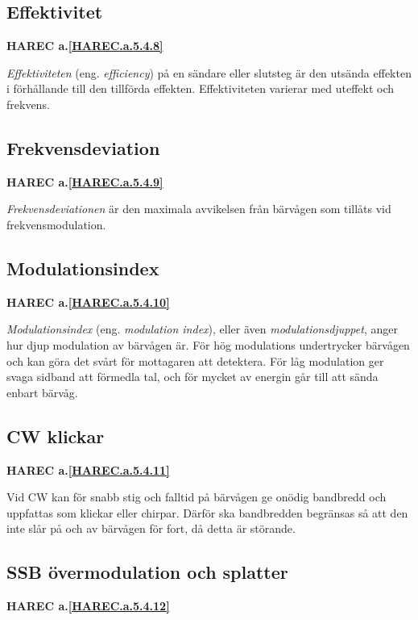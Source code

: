 \subsection{Effektivitet}
\textbf{HAREC
  a.\ref{HAREC.a.5.4.8}\label{myHAREC.a.5.4.8}
}

\emph{Effektiviteten} (eng. \emph{efficiency}) på en sändare eller slutsteg
är den utsända effekten i förhållande till den tillförda effekten.
Effektiviteten varierar med uteffekt och frekvens.

\subsection{Frekvensdeviation}
\textbf{HAREC
  a.\ref{HAREC.a.5.4.9}\label{myHAREC.a.5.4.9}
}

\emph{Frekvensdeviationen} är den maximala avvikelsen från bärvågen som
tillåts vid frekvensmodulation.

\subsection{Modulationsindex}
\textbf{HAREC
  a.\ref{HAREC.a.5.4.10}\label{myHAREC.a.5.4.10}
}

\emph{Modulationsindex} (eng. \emph{modulation index}), eller även
\emph{modulationsdjuppet}, anger hur djup modulation av bärvågen är.
För hög modulations undertrycker bärvågen och kan göra det svårt för
mottagaren att detektera.
För låg modulation ger svaga sidband att förmedla tal, och för mycket
av energin går till att sända enbart bärvåg.

\subsection{CW klickar}
\textbf{HAREC
  a.\ref{HAREC.a.5.4.11}\label{myHAREC.a.5.4.11}
}

Vid CW kan för snabb stig och falltid på bärvågen ge onödig bandbredd och
uppfattas som klickar eller chirpar. Därför ska bandbredden begränsas så att
den inte slår på och av bärvågen för fort, då detta är störande.

\subsection{SSB övermodulation och splatter}
\textbf{HAREC
  a.\ref{HAREC.a.5.4.12}\label{myHAREC.a.5.4.12}
}

